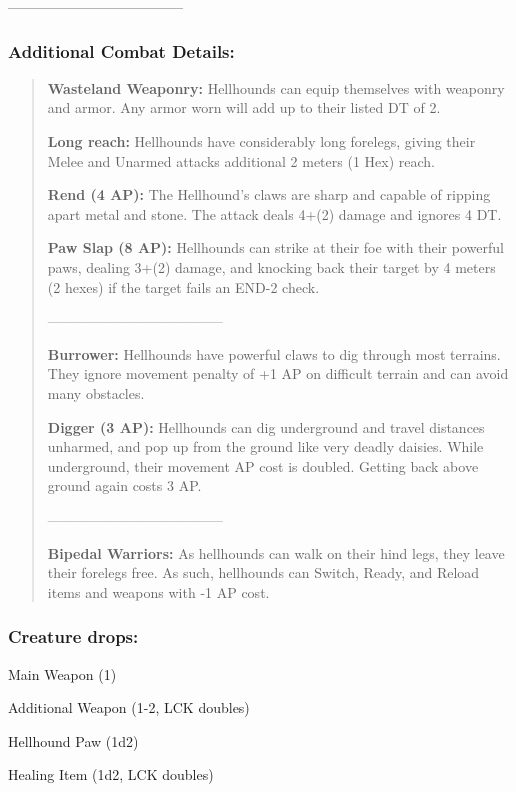 \documentclass[11pt,a4paper,twocolumn]{book}
\begin{document}
	--------------------------------------
	
	\subsubsection*{Additional Combat Details:}
	\begin{verse}
		\textbf{Wasteland Weaponry:} Hellhounds can equip themselves with weaponry and armor. Any armor worn will add up to their listed DT of 2.
		
		\textbf{Long reach:} Hellhounds have considerably long forelegs, giving their Melee and Unarmed attacks additional 2 meters (1 Hex) reach.
		
		\textbf{Rend (4 AP):} The Hellhound's claws are sharp and capable of ripping apart metal and stone. The attack deals 4+(2) damage and ignores 4 DT.
		
		\textbf{Paw Slap (8 AP):} Hellhounds can strike at their foe with their powerful paws, dealing 3+(2) damage, and knocking back their target by 4 meters (2 hexes) if the target fails an END-2 check.		
		
		--------------------------------------				
		
		\textbf{Burrower:} Hellhounds have powerful claws to dig through most terrains. They ignore movement penalty of +1 AP on difficult terrain and can avoid many obstacles.
		
		\textbf{Digger (3 AP):} Hellhounds can dig underground and travel distances unharmed, and pop up from the ground like very deadly daisies. While underground, their movement AP cost is doubled. Getting back above ground again costs 3 AP.
		
		--------------------------------------
		
		\textbf{Bipedal Warriors:} As hellhounds can walk on their hind legs, they leave their forelegs free. As such, hellhounds can Switch, Ready, and Reload items and weapons with -1 AP cost.
		
	\end{verse}
	
	\subsubsection*{Creature drops:}
	\begin{compactitem}
		\item Main Weapon (1)
		\item Additional Weapon (1-2, LCK doubles)
		\item Hellhound Paw (1d2)
		\item Healing Item (1d2, LCK doubles)
	\end{compactitem}
	
\end{document}
